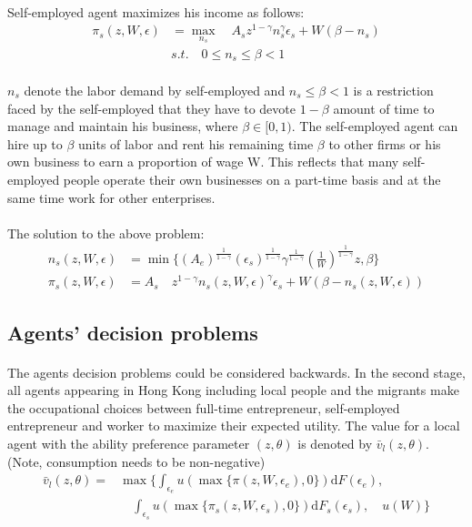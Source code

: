 \documentclass[12pt]{article}
\begin{document}
\paragraph{}
Self-employed agent maximizes his income as follows:
\begin{align*}
\pi_s(z,W,\epsilon)&=\max_{n_s} \quad  A_sz^{1-\gamma}n_s^{\gamma}\epsilon_s+W(\beta-n_s)\\
&s.t. \quad 0 \leq n_s \leq \beta<1
\end{align*}

\paragraph{}
$n_s$ denote the labor demand by self-employed and $n_s \leq \beta<1$ is a restriction faced by the self-employed that they have to devote $1-\beta$ amount of time to manage and maintain his business, where $\beta \in [0,1)$. The self-employed agent can hire up to  $\beta$ units of labor and rent his remaining time $\beta$ to other firms or his own business to earn a proportion of wage W. This reflects that many self-employed people operate their own businesses on a part-time basis and at the same time work for other enterprises. 

\paragraph{}
The solution to the above problem:
\begin{align}
n_s(z,W,\epsilon)&=\min\{(A_e)^{\frac{1}{1-\gamma}}(\epsilon_s)^{\frac{1}{1-\gamma}} \gamma^{\frac{1}{1-\gamma}}(\frac{1}{W})^{\frac{1}{1-\gamma}}z,\beta\}\\
\pi_s(z,W,\epsilon)&= A_s\quad z^{1-\gamma}n_s(z,W,\epsilon)^{\gamma}\epsilon_s+W(\beta-n_s(z,W,\epsilon))
\end{align}






\bigskip
\subsection{Agents' decision problems}
\paragraph{}
The agents decision problems could be considered backwards. In the second stage, all agents appearing in Hong Kong including local people and the migrants make the occupational choices between full-time entrepreneur, self-employed entrepreneur and worker to maximize their expected utility. The value for a local agent with the ability preference parameter $(z,\theta)$ is denoted by $\bar{v}_l (z,\theta)$. (Note, consumption needs to be non-negative)
\begin{align*}
\bar{v}_l (z,\theta)=&\max \{\int_{\epsilon_e}u(\max\{\pi(z,W,\epsilon_e),0\})\mathrm{d}F(\epsilon_e) , \\&\quad\int_{\epsilon_s}u(\max\{\pi_s(z,W,\epsilon_s),0\})\mathrm{d}F_s(\epsilon_s), \quad u(W)\}
\end{align*}
\end{document}
